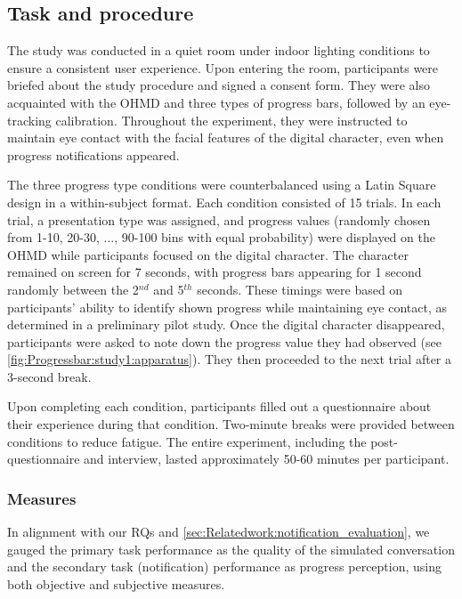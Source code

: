 \subsection{Task and procedure}
\label{sec:Progressbar:study2:task}

The study was conducted in a quiet room under indoor lighting conditions to ensure a consistent user experience. Upon entering the room, participants were briefed about the study procedure and signed a consent form. They were also acquainted with the OHMD and three types of progress bars, followed by an eye-tracking calibration. Throughout the experiment, they were instructed to maintain eye contact with the facial features of the digital character, even when progress notifications appeared.

The three progress type conditions were counterbalanced using a Latin Square design in a within-subject format. Each condition consisted of 15 trials. In each trial, a presentation type was assigned, and progress values (randomly chosen from 1-10, 20-30, ..., 90-100 bins with equal probability) were displayed on the OHMD while participants focused on the digital character. The character remained on screen for 7 seconds, with progress bars appearing for 1 second randomly between the 2$^{nd}$ and 5$^{th}$ seconds. These timings were based on participants' ability to identify shown progress while maintaining eye contact, as determined in a preliminary pilot study. Once the digital character disappeared, participants were asked to note down the progress value they had observed (see \autoref{fig:Progressbar:study1:apparatus}). They then proceeded to the next trial after a 3-second break.

Upon completing each condition, participants filled out a questionnaire about their experience during that condition. Two-minute breaks were provided between conditions to reduce fatigue. The entire experiment, including the post-questionnaire and interview, lasted approximately 50-60 minutes per participant.


\subsubsection*{Measures}
\label{sec:Progressbar:study1:measures}

In alignment with our RQs and \autoref{sec:Relatedwork:notification_evaluation}, we gauged the primary task performance as the quality of the simulated conversation and the secondary task (notification) performance as progress perception, using both objective and subjective measures.


